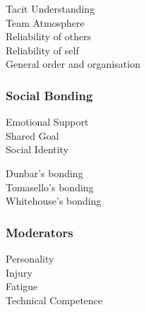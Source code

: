 
          \begin{description}
                \item [Tacit Understanding]
                \item [Team Atmosphere]
                \item [Reliability of others]
                \item [Reliability of self]
                \item [General order and organisation]
          \end{description}


      \subsubsection{Social Bonding}


              \begin{description}
                \item [Emotional Support]
                \item [Shared Goal]
                \item [Social Identity]
              \end{description}


            \begin{description}
              \item [Dunbar's bonding]
              \item [Tomasello's bonding]
              \item [Whitehouse's bonding]
            \end{description}


      \subsubsection{Moderators}


            \begin{description}
              \item [Personality]
              \item [Injury]
              \item [Fatigue]
              \item [Technical Competence]
            \end{description}


